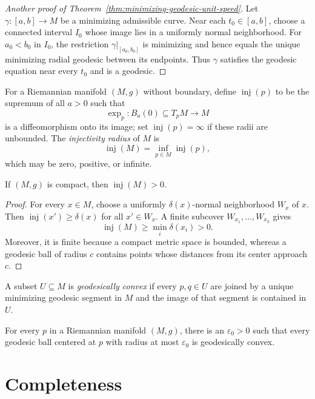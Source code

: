 \begin{proof}[Another proof of Theorem~\ref{thm:minimizing-geodesic-unit-speed}]
\sketch Let $\gamma\colon[a,b]\to M$ be a minimizing admissible curve. Near
each $t_0\in[a,b]$, choose a connected interval $I_0$ whose image lies in a
uniformly normal neighborhood. For $a_0<b_0$ in $I_0$, the restriction
$\gamma|_{[a_0,b_0]}$ is minimizing and hence equals the unique minimizing
radial geodesic between its endpoints. Thus $\gamma$ satisfies the geodesic
equation near every $t_0$ and is a geodesic.
\end{proof}

For a Riemannian manifold $(M,g)$ without boundary, define
$\operatorname{inj}(p)$ to be the supremum of all $a>0$ such that
\[
\exp_p\colon B_a(0)\subseteq T_pM\longrightarrow M
\]
is a diffeomorphism onto its image; set $\operatorname{inj}(p)=\infty$ if
these radii are unbounded. The \emph{injectivity radius} of $M$ is
\[
\operatorname{inj}(M)=\inf_{p\in M}\operatorname{inj}(p),
\]
which may be zero, positive, or infinite.

\begin{lemma}
\label{lem:compact-injectivity-radius-positive}
If $(M,g)$ is compact, then $\operatorname{inj}(M)>0$.
\end{lemma}

\begin{proof}
\sketch For every $x\in M$, choose a uniformly $\delta(x)$-normal
neighborhood $W_x$ of $x$. Then
$\operatorname{inj}(x')\geq\delta(x)$ for all $x'\in W_x$. A finite subcover
$W_{x_1},\ldots,W_{x_k}$ gives
\[
\operatorname{inj}(M)\geq\min_i\delta(x_i)>0.
\]
Moreover, it is finite because a compact metric space is bounded, whereas a
geodesic ball of radius $c$ contains points whose distances from its center
approach $c$.
\end{proof}

A subset $U\subseteq M$ is \emph{geodesically convex} if every $p,q\in U$ are
joined by a unique minimizing geodesic segment in $M$ and the image of that
segment is contained in $U$.

\begin{theorem}
\label{thm:small-geodesic-ball-convex}
For every $p$ in a Riemannian manifold $(M,g)$, there is an
$\varepsilon_0>0$ such that every geodesic ball centered at $p$ with radius at
most $\varepsilon_0$ is geodesically convex.
\end{theorem}

\section{Completeness}

